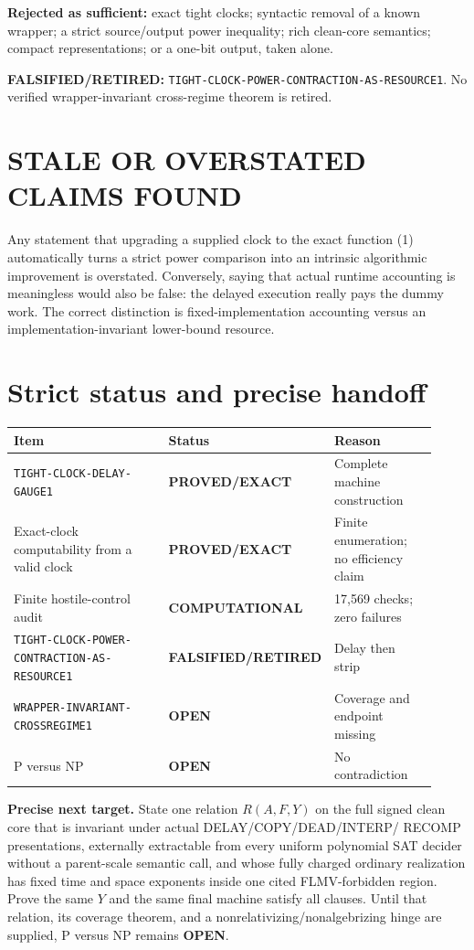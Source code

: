 \documentclass[11pt]{article}
\newcommand{\EXACT}{\textbf{PROVED/EXACT}}
\newcommand{\COMP}{\textbf{COMPUTATIONAL}}
\newcommand{\OPEN}{\textbf{OPEN}}
\newcommand{\RETIRED}{\textbf{FALSIFIED/RETIRED}}
\begin{document}
\textbf{Rejected as sufficient:} exact tight clocks; syntactic removal of a
known wrapper; a strict source/output power inequality; rich clean-core
semantics; compact representations; or a one-bit output, taken alone.

\textbf{FALSIFIED/RETIRED:}
\texttt{TIGHT-CLOCK-POWER-CONTRACTION-AS-RESOURCE1}.  No verified
wrapper-invariant cross-regime theorem is retired.

\section{STALE OR OVERSTATED CLAIMS FOUND}

Any statement that upgrading a supplied clock to the exact function (1)
automatically turns a strict power comparison into an intrinsic algorithmic
improvement is overstated.  Conversely, saying that actual runtime accounting
is meaningless would also be false: the delayed execution really pays the
dummy work.  The correct distinction is fixed-implementation accounting
versus an implementation-invariant lower-bound resource.

\section{Strict status and precise handoff}

\begin{center}\small
\begin{tabular}{p{0.47\linewidth}p{0.18\linewidth}p{0.27\linewidth}}
\toprule
Item & Status & Reason\\ \midrule
\texttt{TIGHT-CLOCK-DELAY-GAUGE1} & \EXACT & Complete machine construction\\
Exact-clock computability from a valid clock & \EXACT & Finite enumeration; no efficiency claim\\
Finite hostile-control audit & \COMP & 17,569 checks; zero failures\\
\texttt{TIGHT-CLOCK-POWER-CONTRACTION-AS-RESOURCE1} & \RETIRED & Delay then strip\\
\texttt{WRAPPER-INVARIANT-CROSSREGIME1} & \OPEN & Coverage and endpoint missing\\
P versus NP & \OPEN & No contradiction\\ \bottomrule
\end{tabular}
\end{center}

\textbf{Precise next target.}  State one relation $R(A,F,Y)$ on the full
signed clean core that is invariant under actual DELAY/COPY/DEAD/INTERP/
RECOMP presentations, externally extractable from every uniform polynomial
SAT decider without a parent-scale semantic call, and whose fully charged
ordinary realization has fixed time and space exponents inside one cited
FLMV-forbidden region.  Prove the same $Y$ and the same final machine satisfy
all clauses.  Until that relation, its coverage theorem, and a
nonrelativizing/nonalgebrizing hinge are supplied, P versus NP remains \OPEN.
\end{document}
